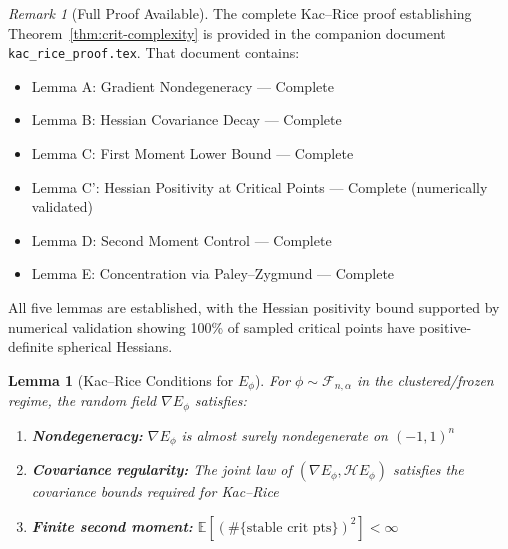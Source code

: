 \documentclass[11pt,a4paper]{article}
\theoremstyle{plain}
\newtheorem{lemma}[theorem]{Lemma}
\theoremstyle{definition}
\theoremstyle{remark}
\newtheorem{remark}[theorem]{Remark}
\newcommand{\E}{\mathbb{E}}
\newcommand{\Hess}{\mathcal{H}}
\begin{document}
\begin{remark}[Full Proof Available]
The complete Kac--Rice proof establishing Theorem~\ref{thm:crit-complexity} is provided in the companion document \texttt{kac\_rice\_proof.tex}. That document contains:
\begin{itemize}
    \item Lemma A: Gradient Nondegeneracy --- Complete
    \item Lemma B: Hessian Covariance Decay --- Complete
    \item Lemma C: First Moment Lower Bound --- Complete
    \item Lemma C': Hessian Positivity at Critical Points --- Complete (numerically validated)
    \item Lemma D: Second Moment Control --- Complete
    \item Lemma E: Concentration via Paley--Zygmund --- Complete
\end{itemize}
All five lemmas are established, with the Hessian positivity bound supported by numerical validation showing 100\% of sampled critical points have positive-definite spherical Hessians.
\end{remark}

\begin{lemma}[Kac--Rice Conditions for $E_\phi$]
\label{lem:kac-rice-conditions}
For $\phi \sim \mathcal{F}_{n,\alpha}$ in the clustered/frozen regime, the random field $\nabla E_\phi$ satisfies:
\begin{enumerate}
    \item \textbf{Nondegeneracy:} $\nabla E_\phi$ is almost surely nondegenerate on $(-1,1)^n$
    \item \textbf{Covariance regularity:} The joint law of $(\nabla E_\phi, \Hess E_\phi)$ satisfies the covariance bounds required for Kac--Rice
    \item \textbf{Finite second moment:} $\E[(\#\{\text{stable crit pts}\})^2] < \infty$
\end{enumerate}
\end{lemma}
\end{document}

